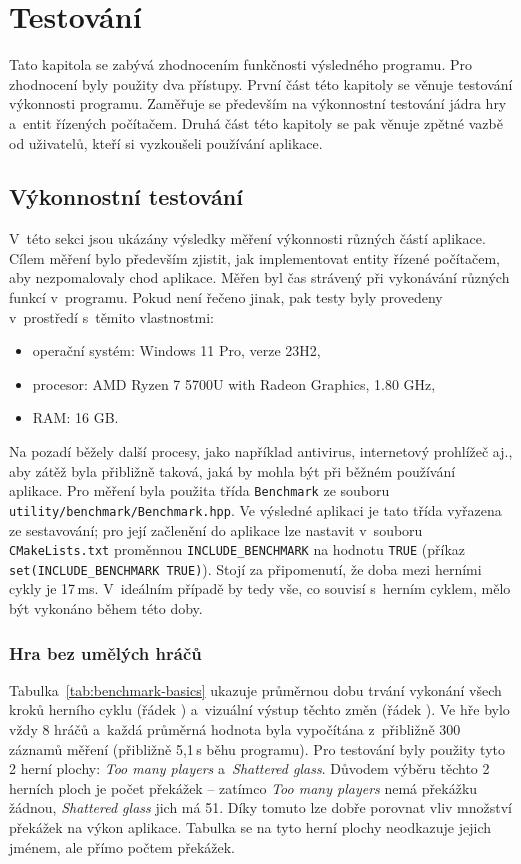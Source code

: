 \chapter{Testování}
\label{ch:testovani}

Tato kapitola se zabývá zhodnocením funkčnosti výsledného programu. Pro zhodnocení byly použity dva přístupy. První část této kapitoly se věnuje testování výkonnosti programu. Zaměřuje se především na výkonnostní testování jádra hry a~entit řízených počítačem. Druhá část této kapitoly se pak věnuje zpětné vazbě od uživatelů, kteří si vyzkoušeli používání aplikace.

\section{Výkonnostní testování}
\label{sec:vykonnostni-testovani}

V~této sekci jsou ukázány výsledky měření výkonnosti různých částí aplikace. Cílem měření bylo především zjistit, jak implementovat entity řízené počítačem, aby nezpomalovaly chod aplikace. Měřen byl čas strávený při vykonávání různých funkcí v~programu. Pokud není řečeno jinak, pak testy byly provedeny v~prostředí s~těmito vlastnostmi:
\begin{itemize}
    \item operační systém: Windows 11 Pro, verze 23H2,
    \item procesor: AMD Ryzen 7 5700U with Radeon Graphics, 1.80 GHz,
    \item RAM: 16 GB.
\end{itemize}
Na pozadí běžely další procesy, jako například antivirus, internetový prohlížeč aj., aby zátěž byla přibližně taková, jaká by mohla být při běžném používání aplikace. Pro měření byla použita třída \texttt{Benchmark} ze souboru \texttt{utility/benchmark/Benchmark.hpp}. Ve výsledné aplikaci je tato třída vyřazena ze sestavování; pro její začlenění do aplikace lze nastavit v~souboru \texttt{CMakeLists.txt} proměnnou \texttt{INCLUDE\_BENCHMARK} na hodnotu \texttt{TRUE} (příkaz \texttt{set(INCLUDE\_BENCHMARK TRUE)}). Stojí za připomenutí, že doba mezi herními cykly je 17\,ms. V~ideálním případě by tedy vše, co souvisí s~herním cyklem, mělo být vykonáno během této doby.

\subsection*{Hra bez umělých hráčů}

Tabulka~\ref{tab:benchmark-basics} ukazuje průměrnou dobu trvání vykonání všech kroků herního cyklu (řádek ) a~vizuální výstup těchto změn (řádek ). Ve hře bylo vždy 8 hráčů a~každá průměrná hodnota byla vypočítána z~přibližně 300 záznamů měření (přibližně 5,1\,s běhu programu). Pro testování byly použity tyto 2 herní plochy: \emph{Too many players} a~\emph{Shattered glass}. Důvodem výběru těchto 2 herních ploch je počet překážek -- zatímco \emph{Too many players} nemá překážku žádnou, \emph{Shattered glass} jich má 51. Díky tomuto lze dobře porovnat vliv množství překážek na výkon aplikace. Tabulka se na tyto herní plochy neodkazuje jejich jménem, ale přímo počtem překážek.

